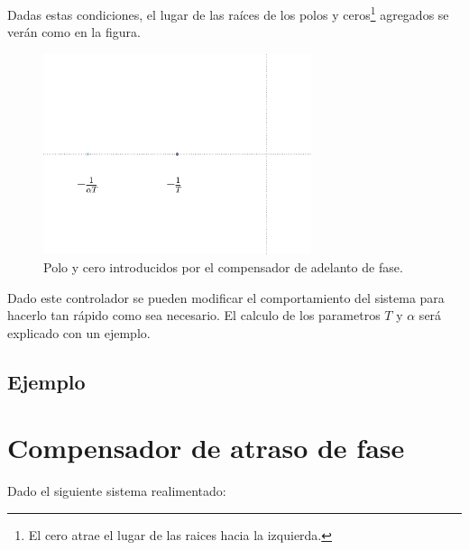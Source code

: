         Dadas estas condiciones, el lugar de las raíces de los polos y ceros\footnote{El cero atrae el lugar de las raices hacia la izquierda.} agregados se verán como en la figura.

        \begin{figure}
            \centering
            \includegraphics[width=0.7\textwidth]{./imagenes/adelantopoloycero.pdf}
            \caption{\label{fig:adelantopoloycero}Polo y cero introducidos por el compensador de adelanto de fase.}
        \end{figure}

        Dado este controlador se pueden modificar el comportamiento del sistema para hacerlo tan rápido como sea necesario. El calculo de los parametros $T$ y $\alpha$ será explicado con un ejemplo.


        \subsection{Ejemplo}


    \newpage
    \section{Compensador de atraso de fase}

        Dado el siguiente sistema realimentado:

